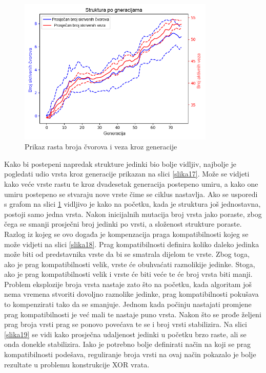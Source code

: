 \documentclass[times, utf8, diplomski, numeric]{fer}
\begin{document}
\begin{figure}
  \centering
  \includegraphics[height=7cm]{slika16}
  \caption{Prikaz rasta broja čvorova i veza kroz generacije}
  \label{slika16}
\end{figure}

Kako bi postepeni napredak strukture jedinki bio bolje vidljiv, najbolje je pogledati udio vrsta kroz generacije prikazan na slici \ref{slika17}. Može se vidjeti kako veće vrste rastu te kroz dvadesetak generacija postepeno umiru, a kako one umiru postepeno se stvaraju nove vrste čime se ciklus nastavlja. Ako se usporedi s grafom na slici \ref{slika16} vidljivo je kako na početku, kada je struktura još jednostavna, postoji samo jedna vrsta. Nakon inicijalnih mutacija broj vrsta jako poraste, zbog čega se smanji prosječni broj jedinki po vrsti, a složenost strukture poraste. Razlog iz kojeg se ovo događa je kompenzacija praga kompatibilnosti kojeg se može vidjeti na slici \ref{slika18}. Prag kompatibilnosti definira koliko daleko jedinka može biti od predstavnika vrste da bi se smatrala dijelom te vrste. Zbog toga, ako je prag kompatibilnosti velik, vrste će obuhvaćati raznolikije jedinke. Stoga, ako je prag kompatibilnosti velik i vrste će biti veće te će broj vrsta biti manji. Problem eksplozije broja vrsta nastaje zato što na početku, kada algoritam još nema vremena stvoriti dovoljno raznolike jedinke, prag kompatibilnosti pokušava to kompenzirati tako da se smanjuje. Jednom kada počinju nastajati promjene prag kompatibilnosti je već mali te nastaje puno vrsta. Nakon što se prođe željeni prag broja vrsti prag se ponovo povećava te se i broj vrsti stabilizira. Na slici \ref{slika19} se vidi kako prosječna udaljenost jedinki u početku brzo raste, ali se onda donekle stabilizira. Iako je potrebno bolje definirati način na koji se prag kompatibilnosti podešava, reguliranje broja vrsti na ovaj način pokazalo je bolje rezultate u problemu konstrukcije XOR vrata.
\end{document}
